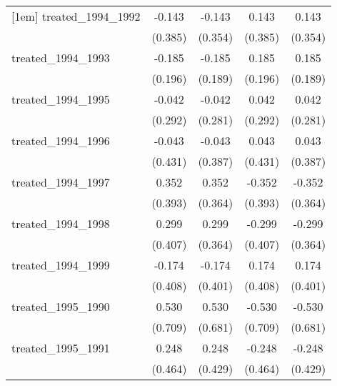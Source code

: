 {\begin{tabular}{l*{4}{c}}
[1em]
treated\_1994\_1992&      -0.143         &      -0.143         &       0.143         &       0.143         \\
            &     (0.385)         &     (0.354)         &     (0.385)         &     (0.354)         \\
[1em]
treated\_1994\_1993&      -0.185         &      -0.185         &       0.185         &       0.185         \\
            &     (0.196)         &     (0.189)         &     (0.196)         &     (0.189)         \\
[1em]
treated\_1994\_1995&      -0.042         &      -0.042         &       0.042         &       0.042         \\
            &     (0.292)         &     (0.281)         &     (0.292)         &     (0.281)         \\
[1em]
treated\_1994\_1996&      -0.043         &      -0.043         &       0.043         &       0.043         \\
            &     (0.431)         &     (0.387)         &     (0.431)         &     (0.387)         \\
[1em]
treated\_1994\_1997&       0.352         &       0.352         &      -0.352         &      -0.352         \\
            &     (0.393)         &     (0.364)         &     (0.393)         &     (0.364)         \\
[1em]
treated\_1994\_1998&       0.299         &       0.299         &      -0.299         &      -0.299         \\
            &     (0.407)         &     (0.364)         &     (0.407)         &     (0.364)         \\
[1em]
treated\_1994\_1999&      -0.174         &      -0.174         &       0.174         &       0.174         \\
            &     (0.408)         &     (0.401)         &     (0.408)         &     (0.401)         \\
[1em]
treated\_1995\_1990&       0.530         &       0.530         &      -0.530         &      -0.530         \\
            &     (0.709)         &     (0.681)         &     (0.709)         &     (0.681)         \\
[1em]
treated\_1995\_1991&       0.248         &       0.248         &      -0.248         &      -0.248         \\
            &     (0.464)         &     (0.429)         &     (0.464)         &     (0.429)         \\

\end{tabular}}
